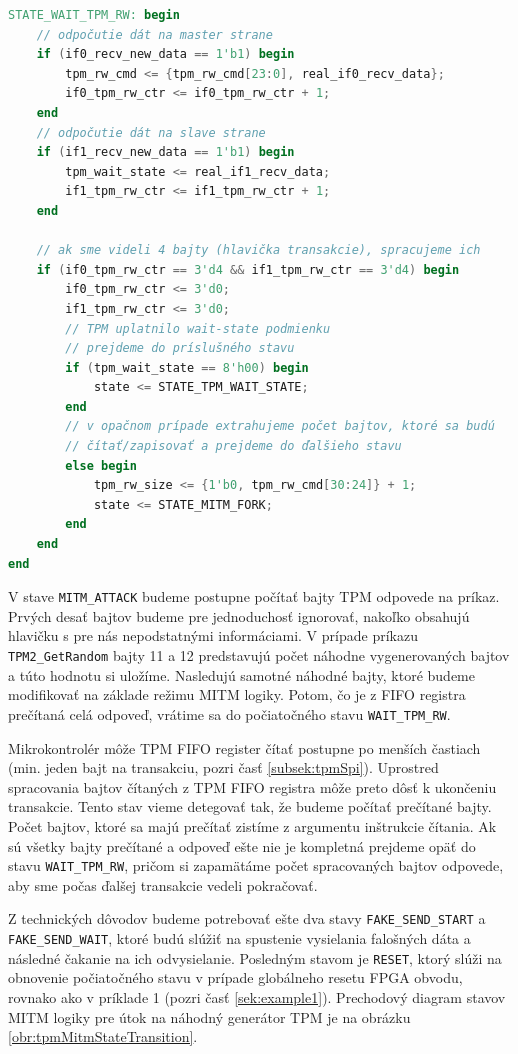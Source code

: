 \begin{lstlisting}[float,language=Verilog,caption={Logika stavu \texttt{WAIT\_TPM\_RW}.},label=snip:tpmRwState]
STATE_WAIT_TPM_RW: begin
    // odpočutie dát na master strane
    if (if0_recv_new_data == 1'b1) begin
        tpm_rw_cmd <= {tpm_rw_cmd[23:0], real_if0_recv_data};
        if0_tpm_rw_ctr <= if0_tpm_rw_ctr + 1;
    end
    // odpočutie dát na slave strane
    if (if1_recv_new_data == 1'b1) begin
        tpm_wait_state <= real_if1_recv_data;
        if1_tpm_rw_ctr <= if1_tpm_rw_ctr + 1;
    end
    
    // ak sme videli 4 bajty (hlavička transakcie), spracujeme ich
    if (if0_tpm_rw_ctr == 3'd4 && if1_tpm_rw_ctr == 3'd4) begin
        if0_tpm_rw_ctr <= 3'd0;
        if1_tpm_rw_ctr <= 3'd0;
        // TPM uplatnilo wait-state podmienku
        // prejdeme do príslušného stavu
        if (tpm_wait_state == 8'h00) begin
            state <= STATE_TPM_WAIT_STATE;
        end
        // v opačnom prípade extrahujeme počet bajtov, ktoré sa budú
        // čítať/zapisovať a prejdeme do ďalšieho stavu
        else begin
            tpm_rw_size <= {1'b0, tpm_rw_cmd[30:24]} + 1;
            state <= STATE_MITM_FORK;
        end
    end
end
\end{lstlisting}

V stave \texttt{MITM\_ATTACK} budeme postupne počítať bajty TPM odpovede na príkaz. Prvých desať bajtov budeme pre jednoduchosť ignorovať, nakoľko obsahujú hlavičku s pre nás nepodstatnými informáciami. V prípade príkazu \texttt{TPM2\_GetRandom} bajty 11 a 12 predstavujú počet náhodne vygenerovaných bajtov a túto hodnotu si uložíme. Nasledujú samotné náhodné bajty, ktoré budeme modifikovať na základe režimu MITM logiky. Potom, čo je z FIFO registra prečítaná celá odpoveď, vrátime sa do počiatočného stavu \texttt{WAIT\_TPM\_RW}.

Mikrokontrolér môže TPM FIFO register čítať postupne po menších častiach (min. jeden bajt na transakciu, pozri časť \ref{subsek:tpmSpi}). Uprostred spracovania bajtov čítaných z TPM FIFO registra môže preto dôsť k ukončeniu transakcie. Tento stav vieme detegovať tak, že budeme počítať prečítané bajty. Počet bajtov, ktoré sa majú prečítať zistíme z argumentu inštrukcie čítania. Ak sú všetky bajty prečítané a odpoveď ešte nie je kompletná prejdeme opäť do stavu \texttt{WAIT\_TPM\_RW}, pričom si zapamätáme počet spracovaných bajtov odpovede, aby sme počas ďalšej transakcie vedeli pokračovať.

Z technických dôvodov budeme potrebovať ešte dva stavy \texttt{FAKE\_SEND\_START} a \texttt{FAKE\_SEND\_WAIT}, ktoré budú slúžiť na spustenie vysielania falošných dáta a následné čakanie na ich odvysielanie. Posledným stavom je \texttt{RESET}, ktorý slúži na obnovenie počiatočného stavu v prípade globálneho resetu FPGA obvodu, rovnako ako v príklade 1 (pozri časť \ref{sek:example1}). Prechodový diagram stavov MITM logiky pre útok na náhodný generátor TPM je na obrázku \ref{obr:tpmMitmStateTransition}.

